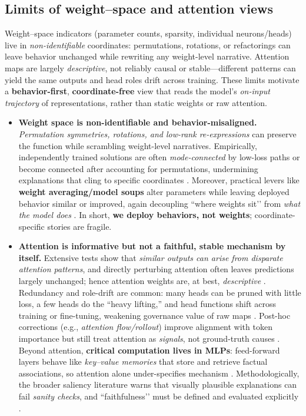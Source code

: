 \documentclass[11pt]{article}
\begin{document}
\noindent
\subsection{Limits of weight–space and attention views}
Weight–space indicators (parameter counts, sparsity, individual neurons/heads) live in \emph{non-identifiable} coordinates: permutations, rotations, or refactorings can leave behavior unchanged while rewriting any weight-level narrative. Attention maps are largely \emph{descriptive}, not reliably causal or stable—different patterns can yield the same outputs and head roles drift across training. These limits motivate a \textbf{behavior-first}, \textbf{coordinate-free} view that reads the model’s \emph{on-input trajectory} of representations, rather than static weights or raw attention.


\begin{itemize}[leftmargin=*,itemsep=0.55em]

  \item \textbf{Weight space is non-identifiable and behavior-misaligned.}
  \emph{Permutation symmetries, rotations, and low-rank re-expressions} can preserve the function while scrambling weight-level narratives. Empirically, independently trained solutions are often \emph{mode-connected} by low-loss paths or become connected after accounting for permutations, undermining explanations that cling to specific coordinates \citep{garipov2018loss,draxler2018essentially,li2018visualizing,entezari2022role,ainsworth2023git}. Moreover, practical levers like \textbf{weight averaging/model soups} alter parameters while leaving deployed behavior similar or improved, again decoupling “where weights sit’’ from \emph{what the model does} \citep{wortsman2022model}. In short, \textbf{we deploy behaviors, not weights}; coordinate-specific stories are fragile.

  \item \textbf{Attention is informative but not a faithful, stable mechanism by itself.}
  Extensive tests show that \emph{similar outputs can arise from disparate attention patterns}, and directly perturbing attention often leaves predictions largely unchanged; hence attention weights are, at best, \emph{descriptive} \citep{jain2019attention,serrano2019attention}. Redundancy and role-drift are common: many heads can be pruned with little loss, a few heads do the “heavy lifting,” and head functions shift across training or fine-tuning, weakening governance value of raw maps \citep{michel2019sixteen,voita2019analyzing,clark2019bert,kovaleva2019revealing}. Post-hoc corrections (e.g., \emph{attention flow/rollout}) improve alignment with token importance but still treat attention as \emph{signals}, not ground-truth causes \citep{abnar2020quantifying}.
  Beyond attention, \textbf{critical computation lives in MLPs}: feed-forward layers behave like \emph{key–value memories} that store and retrieve factual associations, so attention alone under-specifies mechanism \citep{geva2021ffkv}.
  Methodologically, the broader saliency literature warns that visually plausible explanations can fail \emph{sanity checks}, and “faithfulness’’ must be defined and evaluated explicitly \citep{adebayo2018sanity,jacovi2020faithfulness}.


\end{itemize}
\end{document}
